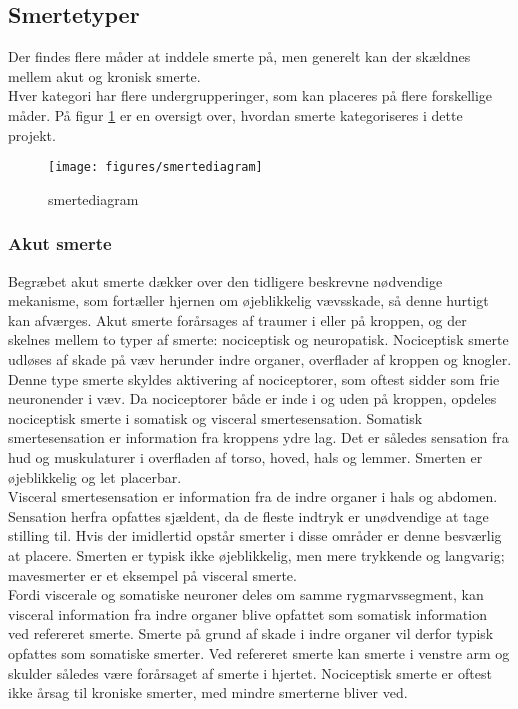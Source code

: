 \subsection{Smertetyper}
Der findes flere måder at inddele smerte på, men generelt kan der skældnes mellem akut og kronisk smerte. \\
Hver kategori har flere undergrupperinger, som kan placeres på flere forskellige måder. \citep{Giangregorio1997} På figur \ref{smertediagram} er en oversigt over, hvordan smerte kategoriseres i dette projekt.

\begin{figure}[H]
	\centering
	\texttt{[image: figures/smertediagram]}
	\caption{smertediagram}
	\label{smertediagram}
	\flushleft
\end{figure}

\subsubsection{Akut smerte}
Begræbet akut smerte dækker over den tidligere beskrevne nødvendige mekanisme, som fortæller hjernen om øjeblikkelig vævsskade, så denne hurtigt kan afværges. Akut smerte forårsages af traumer i eller på kroppen, og der skelnes mellem to typer af smerte: nociceptisk og neuropatisk. Nociceptisk smerte udløses af skade på væv herunder indre organer, overflader af kroppen og knogler. Denne type smerte skyldes aktivering af nociceptorer, som oftest sidder som frie neuronender i væv. Da nociceptorer både er inde i og uden på kroppen, opdeles nociceptisk smerte i somatisk og visceral smertesensation. Somatisk smertesensation er information fra kroppens ydre lag. Det er således sensation fra hud og muskulaturer i overfladen af torso, hoved, hals og lemmer. \citep{Martini} Smerten er øjeblikkelig og let placerbar. \\
Visceral smertesensation er information fra de indre organer i hals og abdomen. Sensation herfra opfattes sjældent, da de fleste indtryk er unødvendige at tage stilling til. Hvis der imidlertid opstår smerter i disse områder er denne besværlig at placere. Smerten er typisk ikke øjeblikkelig, men mere trykkende og langvarig; mavesmerter er et eksempel på visceral smerte. \citep{Martini} \\
Fordi viscerale og somatiske neuroner deles om samme rygmarvssegment, kan visceral information fra indre organer blive opfattet som somatisk information ved refereret smerte. Smerte på grund af skade i indre organer vil derfor typisk opfattes som somatiske smerter. Ved refereret smerte kan smerte i venstre arm og skulder således være forårsaget af smerte i hjertet. \citep{Martini} Nociceptisk smerte er oftest ikke årsag til kroniske smerter, med mindre smerterne bliver ved.\\ 

